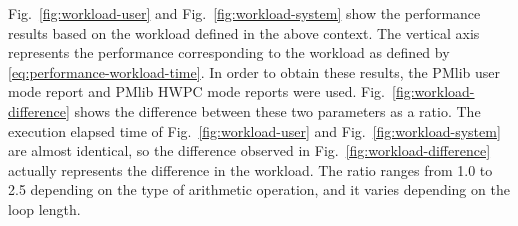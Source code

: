 \documentclass[conference]{IEEEtran}
\begin{document}
Fig.~\ref{fig:workload-user} and Fig.~\ref{fig:workload-system} show
the performance results based on the workload defined in the above context.
The vertical axis represents the performance corresponding to the workload as
defined by \eqref{eq:performance-workload-time}.
In order to obtain these results, the PMlib user mode report and PMlib HWPC
mode reports were used.
Fig.~\ref{fig:workload-difference} shows the difference between these two
parameters as a ratio.
%
%
The execution elapsed time
of Fig.~\ref{fig:workload-user} and Fig.~\ref{fig:workload-system} are
almost identical, so the difference observed in
Fig.~\ref{fig:workload-difference} 
actually represents the difference in the workload.
The ratio ranges from 1.0 to 2.5 depending on the type of
arithmetic operation, and it varies depending on the loop length.
\end{document}

